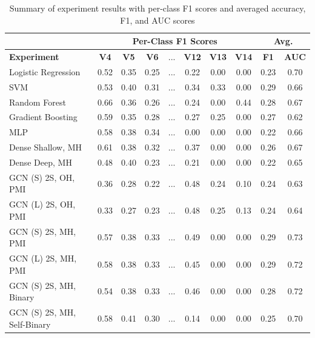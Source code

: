 \documentclass{article}
\begin{document}
\begin{table}[h!]
\centering
\caption{Summary of experiment results with per-class F1 scores and averaged accuracy, F1, and AUC scores}
\label{tab:my-table}
\begin{tabular}{@{}lccclccccc@{}}
\toprule
                            & \multicolumn{7}{c}{\textbf{Per-Class F1 Scores}} & \multicolumn{2}{c}{\textbf{Avg.}} \\ \midrule
\textbf{Experiment} & \textbf{V4} & \textbf{V5} & \textbf{V6} & ... & \textbf{V12} & \textbf{V13} & \textbf{V14} & \textbf{F1} & \textbf{AUC} \\
Logistic Regression         & 0.52  & 0.35  & 0.25  & ... & 0.22 & 0.00 & 0.00 & 0.23            & 0.70            \\
SVM                         & 0.53  & 0.40  & 0.31  & ... & 0.34 & 0.33 & 0.00 & 0.29            & 0.66            \\
Random Forest               & 0.66  & 0.36  & 0.26  & ... & 0.24 & 0.00 & 0.44 & 0.28            & 0.67            \\
Gradient Boosting           & 0.59  & 0.35  & 0.28  & ... & 0.27 & 0.25 & 0.00 & 0.27            & 0.62            \\
MLP                         & 0.58  & 0.38  & 0.34  & ... & 0.00 & 0.00 & 0.00 & 0.22            & 0.66            \\
Dense Shallow, MH           & 0.61  & 0.38  & 0.32  & ... & 0.37 & 0.00 & 0.00 & 0.26            & 0.67            \\
Dense Deep, MH              & 0.48  & 0.40  & 0.23  & ... & 0.21 & 0.00 & 0.00 & 0.22            & 0.65            \\
GCN (S) 2S, OH, PMI         & 0.36  & 0.28  & 0.22  & ... & 0.48 & 0.24 & 0.10 & 0.24            & 0.63            \\
GCN (L) 2S, OH, PMI         & 0.33  & 0.27  & 0.23  & ... & 0.48 & 0.25 & 0.13 & 0.24            & 0.64            \\
GCN (S) 2S, MH, PMI         & 0.57  & 0.38  & 0.33  & ... & 0.49 & 0.00 & 0.00 & 0.29            & 0.73            \\
GCN (L) 2S, MH, PMI         & 0.58  & 0.38  & 0.33  & ... & 0.45 & 0.00 & 0.00 & 0.29            & 0.72            \\
GCN (S) 2S, MH, Binary      & 0.54  & 0.38  & 0.33  & ... & 0.46 & 0.00 & 0.00 & 0.28            & 0.72            \\
GCN (S) 2S, MH, Self-Binary & 0.58  & 0.41  & 0.30  & ... & 0.14 & 0.00 & 0.00 & 0.25            & 0.70            \\

\end{tabular}
\end{table}
\end{document}
